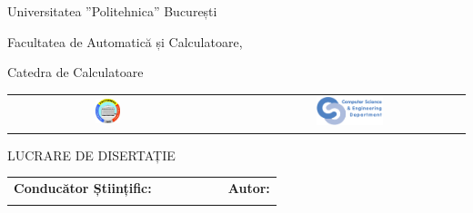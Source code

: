 \begin{titlepage}
	\begin{center}
		{\Large Universitatea ''Politehnica'' București}
		\par\vspace*{2mm}
		{\Large Facultatea de Automatică și Calculatoare,
		
		 Catedra de Calculatoare}
		\par\vspace*{3mm}
		\begin{table}[h]
        	\begin{center}
				\begin{tabular}{cccc}
                    \includegraphics[width=0.13\textwidth]{src/img/branding/upb}
					& & &
					\includegraphics[width=0.30\textwidth]{src/img/branding/cs}
            	\end{tabular}
			\end{center}
		\end{table}
		
		\par\vspace*{35mm}
		{\Huge LUCRARE DE DISERTAȚIE}
		\par\vspace*{15mm}
		{\Huge \VARtitlero }
		\par\vspace*{35mm}
		\begin{table}[h]
        	\begin{center}
				\begin{tabular}{lcccccl}
					\Large \textbf{\Large Conducător
                                        Științific:}
					\vspace*{1mm} &&&&&& \Large \textbf{\Large Autor:}\vspace*{1mm} \\
					\Large \VARadviser &&&&&& \Large \VARauthor
				\end{tabular}
			\end{center}
		\end{table}

		\par\vspace*{40mm}
		\Large \VARtitlefooterro
	\end{center}
\end{titlepage}
